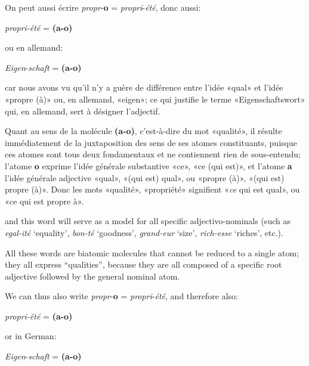 \begin{sloppypar}
{    On peut aussi écrire \emph{propr}-\textbf{o} =
    \emph{propri}-\emph{été}, donc aussi:

    \begin{center}
      \emph{propri-été} = \textbf{(a-o)}
    \end{center}


    \noindent ou en allemand:

    \begin{center}
      \emph{Eigen}-\emph{schaft} = \textbf{(a-o)}
    \end{center}

    \noindent car nous avons vu qu’il n’y a guère de différence entre
    l’idée «qual» et l’idée «propre (à)» ou, en allemand, «eigen»; ce
    qui justifie le terme «Eigenschaftswort» qui, en allemand, sert à
    désigner l’adjectif.

    Quant au sens de la molécule \textbf{(a-o)}, c’est-à-dire du mot
    «qualité», il résulte immédiatement de la juxtaposition des sens
    de ses atomes constituants, puisque ces atomes sont tous deux
    fondamentaux et ne contiennent rien de sous-entendu; l’atome
    \textbf{o} exprime l’idée générale substantive «ce», «ce (qui
    est)», et l’atome \textbf{a} l’idée générale adjective «qual»,
    «(qui est) qual», ou «propre (à)», «(qui est) propre (à)». Donc
    les mots «qualité», «propriété» signifient «\emph{ce} qui est
    qual», ou «ce qui est propre à». } %
  {\noindent and this word will
    serve as a model for all specific adjectivo-nominals (such as
    \emph{egal-ité} `equality', \emph{bon-té} `goodness', \emph{grand-eur}
    `size', \emph{rich-esse} `riches', etc.).

    All these words are biatomic molecules that cannot be reduced to a
    single atom; they all express ``qualities'', because they are all
    composed of a specific root adjective followed by the general
    nominal atom.

    We can thus also write \emph{propr}-\textbf{o} =
    \emph{propri}-\emph{été}, and therefore also:

    \begin{center}
      \emph{propri-été} = \textbf{(a-o)}
    \end{center}

    \noindent or in German:

    \begin{center}
      \emph{Eigen}-\emph{schaft} = \textbf{(a-o)}
    \end{center}

}
\end{sloppypar}
